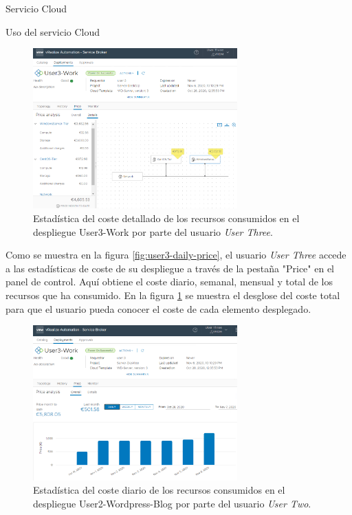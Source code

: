 \begin{subsection}{Servicio Cloud}
\begin{subsubsection}{Uso del servicio Cloud}
        \begin{figure}[h]
            \centering
            \includegraphics[width=0.7\textwidth]{imaxes/pruebaconcepto/vrealize/user3-price-details.png}
            \caption{Estadística del coste detallado de los recursos consumidos en el despliegue User3-Work por parte del usuario \textit{User Three}.}
            \label{fig:user3-detail-price}
        \end{figure}
        \FloatBarrier
        Como se muestra en la figura \ref{fig:user3-daily-price}, el usuario \textit{User Three} accede a las estadísticas de coste de su despliegue a través de la pestaña "Price" en el panel de control. Aquí obtiene el coste diario, semanal, mensual y total de los recursos que ha consumido. En la figura \ref{fig:user3-detail-price} se muestra el desglose del coste total para que el usuario pueda conocer el coste de cada elemento desplegado.
        \begin{figure}[h]
            \centering
            \includegraphics[width=0.7\textwidth]{imaxes/pruebaconcepto/vrealize/price-user3-work.png}
            \caption{Estadística del coste diario de los recursos consumidos en el despliegue User2-Wordpress-Blog por parte del usuario \textit{User Two}.}

\end{figure}
\end{subsubsection}
\end{subsection}
